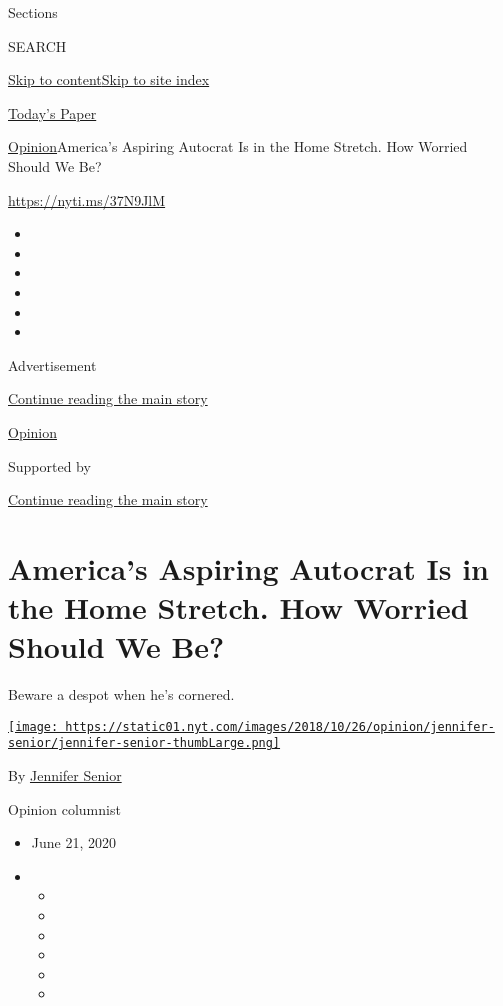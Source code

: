 Sections

SEARCH

\protect\hyperlink{site-content}{Skip to
content}\protect\hyperlink{site-index}{Skip to site index}

\href{https://myaccount.nytimes.com/auth/login?response_type=cookie\&client_id=vi}{}

\href{https://www.nytimes.com/section/todayspaper}{Today's Paper}

\href{/section/opinion}{Opinion}\textbar{}America's Aspiring Autocrat Is
in the Home Stretch. How Worried Should We Be?

\href{https://nyti.ms/37N9JlM}{https://nyti.ms/37N9JlM}

\begin{itemize}
\item
\item
\item
\item
\item
\item
\end{itemize}

Advertisement

\protect\hyperlink{after-top}{Continue reading the main story}

\href{/section/opinion}{Opinion}

Supported by

\protect\hyperlink{after-sponsor}{Continue reading the main story}

\hypertarget{americas-aspiring-autocrat-is-in-the-home-stretch-how-worried-should-we-be}{%
\section{America's Aspiring Autocrat Is in the Home Stretch. How Worried
Should We
Be?}\label{americas-aspiring-autocrat-is-in-the-home-stretch-how-worried-should-we-be}}

Beware a despot when he's cornered.

\href{https://www.nytimes.com/by/jennifer-senior}{\texttt{[image: https://static01.nyt.com/images/2018/10/26/opinion/jennifer-senior/jennifer-senior-thumbLarge.png]}}

By \href{https://www.nytimes.com/by/jennifer-senior}{Jennifer Senior}

Opinion columnist

\begin{itemize}
\item
  June 21, 2020
\item
  \begin{itemize}
  \item
  \item
  \item
  \item
  \item
  \item
  \end{itemize}
\end{itemize}

